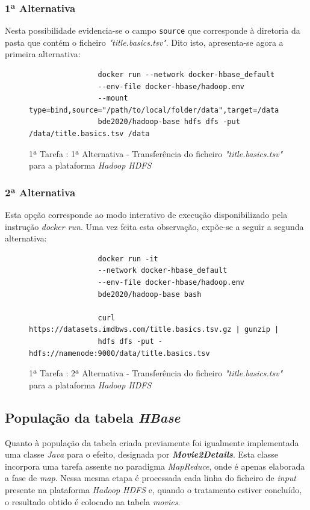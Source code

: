 \documentclass[a4paper]{report}
\begin{document}
{		\subsubsection{1ª Alternativa}
		Nesta possibilidade evidencia-se o campo \texttt{source} que corresponde à diretoria da pasta que contém o ficheiro \textit{"title.basics.tsv"}.
		Dito isto, apresenta-se agora a primeira alternativa:
		\begin{figure}[H]
			{
				\color{teal}
				\begin{verbatim}
				docker run --network docker-hbase_default
				--env-file docker-hbase/hadoop.env
				--mount type=bind,source="/path/to/local/folder/data",target=/data
				bde2020/hadoop-base hdfs dfs -put /data/title.basics.tsv /data
				\end{verbatim}
			}
			\caption{1ª Tarefa : 1ª Alternativa - Transferência do ficheiro \textit{"title.basics.tsv"} para a plataforma \textit{Hadoop HDFS}}
			\label{fig:10}
		\end{figure}
		
		\subsubsection{2ª Alternativa}
		Esta opção corresponde ao modo interativo de execução disponibilizado pela instrução \textit{docker run}.
		Uma vez feita esta observação, expõe-se a seguir a segunda alternativa:
		\begin{figure}[H]
			{
				\color{teal}
				\begin{verbatim}
				docker run -it
				--network docker-hbase_default
				--env-file docker-hbase/hadoop.env
				bde2020/hadoop-base bash
				
				curl https://datasets.imdbws.com/title.basics.tsv.gz | gunzip |
				hdfs dfs -put - hdfs://namenode:9000/data/title.basics.tsv
				\end{verbatim}
			}
			\caption{1ª Tarefa : 2ª Alternativa - Transferência do ficheiro \textit{"title.basics.tsv"} para a plataforma \textit{Hadoop HDFS}}
			\label{fig:11}
		\end{figure}
		
		\subsection{População da tabela \textit{HBase}} \label{subsec:Task1-3}
		Quanto à população da tabela criada previamente foi igualmente implementada uma classe \textit{Java} para o efeito, designada por \textbf{\textit{Movie2Details}}.
		Esta classe incorpora uma tarefa assente no paradigma \textit{MapReduce}, onde é apenas elaborada a fase de \textit{map}.
		Nessa mesma etapa é processada cada linha do ficheiro de \textit{input} presente na plataforma \textit{Hadoop HDFS} e, quando o tratamento estiver concluído, o resultado obtido é colocado na tabela \textit{movies}.
		
}
\end{document}

